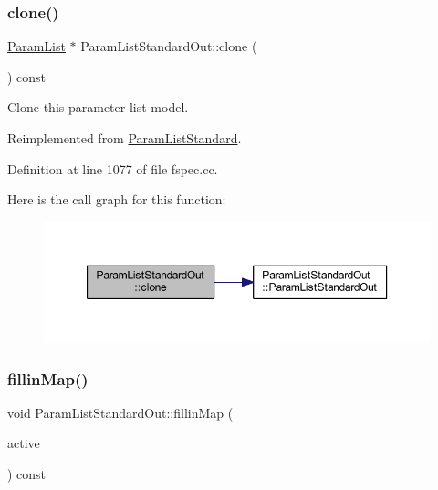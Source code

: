 \subsubsection{\texorpdfstring{clone()}{clone()}}
{\footnotesize\ttfamily \mbox{\hyperlink{class_param_list}{Param\+List}} $\ast$ Param\+List\+Standard\+Out\+::clone (\begin{DoxyParamCaption}\item[{void}]{ }\end{DoxyParamCaption}) const\hspace{0.3cm}{\ttfamily [virtual]}}



Clone this parameter list model. 



Reimplemented from \mbox{\hyperlink{class_param_list_standard_a8257219823fdb31ac4aa59d2c0c640e5}{Param\+List\+Standard}}.



Definition at line 1077 of file fspec.\+cc.

Here is the call graph for this function\+:
\nopagebreak
\begin{figure}[H]
\begin{center}
\leavevmode
\includegraphics[width=350pt]{class_param_list_standard_out_acec6ec68623556e54bdf42a61c20ea0e_cgraph}
\end{center}
\end{figure}
\mbox{\label{class_param_list_standard_out_aab2d6055785c4e98b3a8c4e1b70f86be}} 
\subsubsection{\texorpdfstring{fillinMap()}{fillinMap()}}
{\footnotesize\ttfamily void Param\+List\+Standard\+Out\+::fillin\+Map (\begin{DoxyParamCaption}\item[{\mbox{\hyperlink{class_param_active}{Param\+Active}} $\ast$}]{active }\end{DoxyParamCaption}) const\hspace{0.3cm}{\ttfamily [virtual]}}



